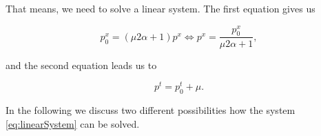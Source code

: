         That means, we need to solve a linear system. The first equation gives us

        \begin{equation}
            p_{0}^{x} = (\mu 2 \alpha + 1) p^{x} \Longleftrightarrow p^{x} = \frac{p_{0}^{x}}{\mu 2 \alpha + 1}, \label{eq:1stequ}
        \end{equation}

        and the second equation leads us to

        \begin{equation}
            p^{t} = p_{0}^{t} + \mu. \label{eq:2ndequ}
        \end{equation}

        In the following we discuss two different possibilities how the system \ref{eq:linearSystem} can be solved.

